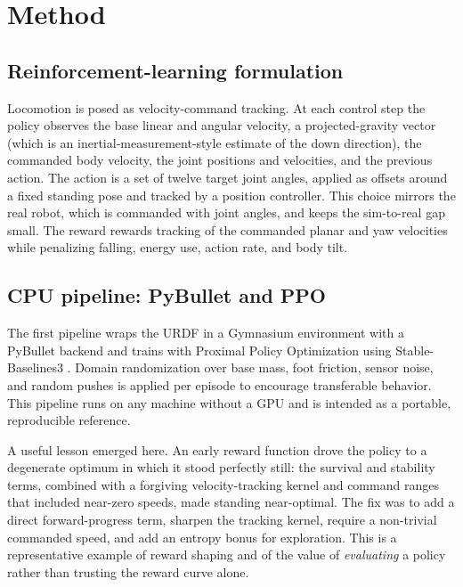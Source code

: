\documentclass[11pt]{article}
\begin{document}
\section{Method}
\subsection{Reinforcement-learning formulation}
Locomotion is posed as velocity-command tracking. At each control step the policy
observes the base linear and angular velocity, a projected-gravity vector (which
is an inertial-measurement-style estimate of the down direction), the commanded
body velocity, the joint positions and velocities, and the previous action. The
action is a set of twelve target joint angles, applied as offsets around a fixed
standing pose and tracked by a position controller. This choice mirrors the real
robot, which is commanded with joint angles, and keeps the sim-to-real gap small.
The reward rewards tracking of the commanded planar and yaw velocities while
penalizing falling, energy use, action rate, and body tilt.

\subsection{CPU pipeline: PyBullet and PPO}
The first pipeline wraps the URDF in a Gymnasium \cite{towers2023gymnasium}
environment with a PyBullet \cite{coumans2021pybullet} backend and trains with
Proximal Policy Optimization \cite{schulman2017ppo} using
Stable-Baselines3 \cite{raffin2021sb3}. Domain randomization over base mass, foot
friction, sensor noise, and random pushes \cite{tobin2017domainrand} is applied
per episode to encourage transferable behavior. This pipeline runs on any
machine without a GPU and is intended as a portable, reproducible reference.

A useful lesson emerged here. An early reward function drove the policy to a
degenerate optimum in which it stood perfectly still: the survival and stability
terms, combined with a forgiving velocity-tracking kernel and command ranges that
included near-zero speeds, made standing near-optimal. The fix was to add a direct
forward-progress term, sharpen the tracking kernel, require a non-trivial
commanded speed, and add an entropy bonus for exploration. This is a
representative example of reward shaping and of the value of \emph{evaluating}
a policy rather than trusting the reward curve alone.
\end{document}
